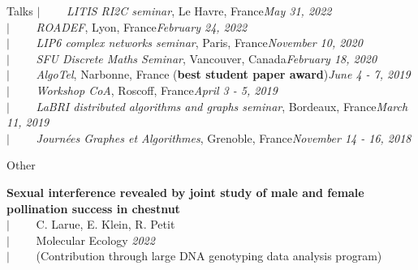 \documentclass[french]{resume} %
\begin{document}
\begin{rSection}{Talks}
		$| \qquad$ \textit{LITIS RI2C seminar}, Le Havre, France\hfill {\em May 31, 2022} \\
		$| \qquad$ \textit{ROADEF}, Lyon, France\hfill {\em February 24, 2022} \\
		$| \qquad$ \textit{LIP6 complex networks seminar}, Paris, France\hfill {\em November 10, 2020} \\
		$| \qquad$ \textit{SFU Discrete Maths Seminar}, Vancouver, Canada\hfill {\em February 18, 2020} \\
		$| \qquad$ \textit{AlgoTel}, Narbonne, France (\textbf{best student paper award})\hfill {\em June 4 - 7, 2019} \\
		$| \qquad$ \textit{Workshop CoA}, Roscoff, France\hfill {\em April 3 - 5, 2019} \\
		$| \qquad$ \textit{LaBRI distributed algorithms and graphs seminar}, Bordeaux, France\hfill {\em March 11, 2019} \\
		$| \qquad$ \textit{Journées Graphes et Algorithmes}, Grenoble, France\hfill {\em November 14 - 16, 2018}
	\end{rSection}
	
	\begin{rSection}{Other
		}
		
		{\bf {\small Sexual interference revealed by joint study of male and female pollination success in chestnut}}\\
		$| \qquad$ C. Larue, E. Klein, R. Petit\\
		$| \qquad$ Molecular Ecology \hfill {\em 2022}\\
		$| \qquad$ (Contribution through large DNA genotyping data analysis program)
	\end{rSection}
	
\end{document}
